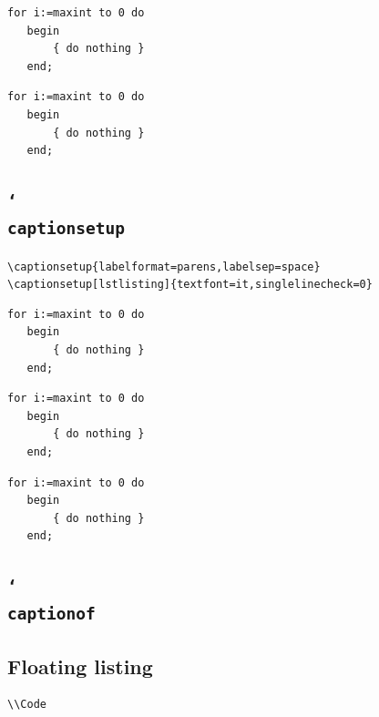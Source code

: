 \documentclass{article}
\DeclareRobustCommand\cs[1]{\texttt{\char`\\#1}}
\begin{document}
   \begin{lstlisting}[caption={Useless code},captionpos=t]
   for i:=maxint to 0 do
   begin
       { do nothing }
   end;
   \end{lstlisting}

   \begin{lstlisting}[caption={Useless code},captionpos=b]
   for i:=maxint to 0 do
   begin
       { do nothing }
   end;
   \end{lstlisting}

\endgroup

\subsection*{\cs{captionsetup}}
\begingroup
  \noindent
  \verb|\captionsetup{labelformat=parens,labelsep=space}|\\
  \verb|\captionsetup[lstlisting]{textfont=it,singlelinecheck=0}|
  \captionsetup{labelformat=parens,labelsep=space}
  \captionsetup[lstlisting]{textfont=it,singlelinecheck=0}
  \lstset{basicstyle=\relax}

   \begin{lstlisting}[caption={Useless code},label=useless10]
   for i:=maxint to 0 do
   begin
       { do nothing }
   end;
   \end{lstlisting}

   \begin{lstlisting}[title={`Caption' without label}]
   for i:=maxint to 0 do
   begin
       { do nothing }
   end;
   \end{lstlisting}

   \begin{lstlisting}[caption=\empty,label=useless11]
   for i:=maxint to 0 do
   begin
       { do nothing }
   end;
   \end{lstlisting}

\endgroup

\subsection*{\cs{captionof}}
\begingroup

  \captionsetup{labelformat=simple}
  \bigskip
 
\endgroup

\fi

\subsection*{Floating listing}

\begin{lstlisting}[float=htb, caption={Messung der Ausfuehrungszeit}, label=list:ZeitMarkert]
  \\Code
\end{lstlisting}
\end{document}
